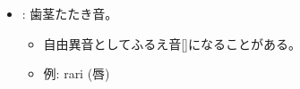\begin{itemize}
    \item \textbf{}: 歯茎たたき音。
    \begin{itemize}
        \item 自由異音としてふるえ音[]になることがある。
        \item 例: rari \textipa{[RaRi]} (唇)
    \end{itemize}
\end{itemize}